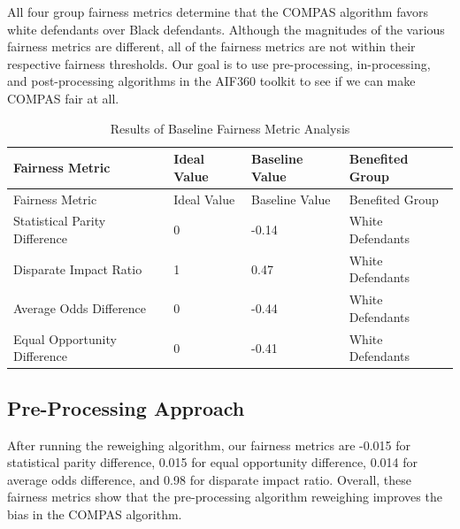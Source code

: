 \documentclass[water,article,submit,moreauthors,pdftex]{mdpi}
\begin{document}
All four group fairness metrics determine that the COMPAS algorithm
favors white defendants over Black defendants. Although the magnitudes
of the various fairness metrics are different, all of the fairness
metrics are not within their respective fairness thresholds. Our goal is
to use pre-processing, in-processing, and post-processing algorithms in
the AIF360 toolkit to see if we can make COMPAS fair at all.

\begin{longtable}[]{@{}llll@{}}
\caption{Results of Baseline Fairness Metric Analysis
\label{tab:baseline metrics table}}\tabularnewline
\toprule
Fairness Metric & Ideal Value & Baseline Value & Benefited
Group\tabularnewline
\midrule
\endfirsthead
\toprule
Fairness Metric & Ideal Value & Baseline Value & Benefited
Group\tabularnewline
\midrule
\endhead
Statistical Parity Difference & 0 & -0.14 & White
Defendants\tabularnewline
Disparate Impact Ratio & 1 & 0.47 & White Defendants\tabularnewline
Average Odds Difference & 0 & -0.44 & White Defendants\tabularnewline
Equal Opportunity Difference & 0 & -0.41 & White
Defendants\tabularnewline
\bottomrule
\end{longtable}

\hypertarget{pre-processing-approach}{%
\subsection{Pre-Processing Approach}\label{pre-processing-approach}}

After running the reweighing algorithm, our fairness metrics are -0.015
for statistical parity difference, 0.015 for equal opportunity
difference, 0.014 for average odds difference, and 0.98 for disparate
impact ratio. Overall, these fairness metrics show that the
pre-processing algorithm reweighing improves the bias in the COMPAS
algorithm.

%

\vspace{6pt}

\end{document}
